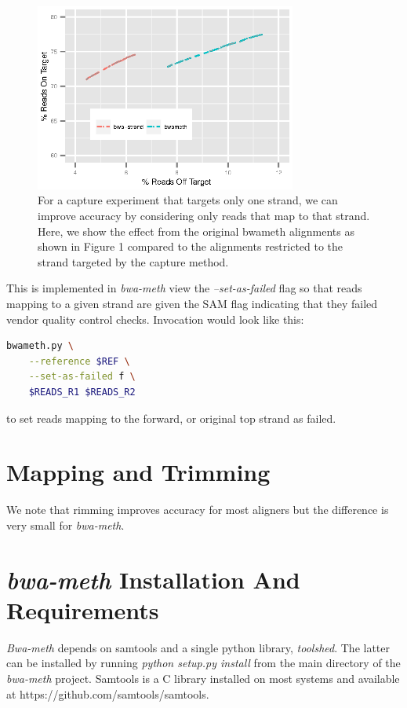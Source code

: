 \documentclass[12pt]{article}
\begin{document}
\begin{figure}[H]%
    \centerline{\includegraphics[width=86mm]{real-bwa-strand.eps}}
    \caption{For a capture experiment that targets only one strand, we can
    improve accuracy by considering only reads that map to that strand.
    Here, we show the effect from the original bwameth alignments as shown
    in Figure 1 compared to the alignments restricted to the strand targeted
    by the capture method.}\label{suppfig:05}
\end{figure}

This is implemented in \textit{bwa-meth} view the \emph{--set-as-failed}
flag so that reads mapping to a given strand are given the SAM flag
indicating that they failed vendor quality control checks. Invocation
would look like this:

\begin{lstlisting}[language=bash]
bwameth.py \
    --reference $REF \
    --set-as-failed f \
    $READS_R1 $READS_R2

\end{lstlisting}
to set reads mapping to the forward, or original top strand
as failed.


\section{Mapping and Trimming}
We note that rimming improves accuracy for most aligners but the
difference is very small for \textit{bwa-meth}.

\section{\textit{bwa-meth} Installation And Requirements}

\textit{Bwa-meth} depends on samtools and a single python library, \textit{toolshed}.
The latter can be installed by running \emph{python setup.py install} from the main
directory of the \textit{bwa-meth} project. Samtools is a C library installed on most
systems and available at https://github.com/samtools/samtools.
\end{document}
